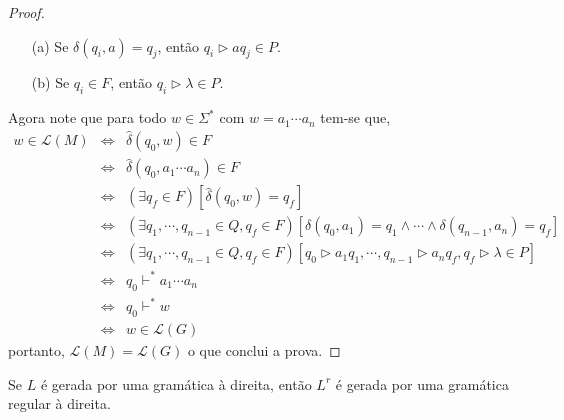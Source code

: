 \begin{proof}
	\begin{itemize}
		\item[(a)] Se $\delta(q_i, a) = q_j$, então $q_i \rhd aq_j \in P$.
		\item[(b)] Se $q_i \in F$, então $q_i \rhd \lambda \in P$.
	\end{itemize} 
	Agora note que para todo $w \in \Sigma^*$ com $w = a_1 \cdots a_n$ tem-se que, 
	\begin{eqnarray*}
		w \in \mathcal{L}(M) & \Longleftrightarrow & \widehat{\delta}(q_0, w) \in F\\
		& \Longleftrightarrow & \widehat{\delta}(q_0, a_1 \cdots a_n) \in F\\
		& \Longleftrightarrow & (\exists q_f \in F)[\widehat{\delta}(q_0, w) = q_f]\\
		& \Longleftrightarrow & (\exists q_1, \cdots, q_{n-1} \in Q,  q_f \in F)[\delta(q_0, a_1) = q_1 \land \cdots \land \delta(q_{n-1}, a_n) = q_f]\\
		& \Longleftrightarrow & (\exists q_1, \cdots, q_{n-1} \in Q,  q_f \in F)[q_0 \rhd a_1q_1, \cdots, q_{n-1} \rhd a_nq_f, q_f \rhd \lambda \in P]\\
		& \Longleftrightarrow & q_0 \vdash^* a_1 \cdots a_n\\
		& \Longleftrightarrow & q_0 \vdash^* w\\
		& \Longleftrightarrow & w \in \mathcal{L}(G)
	\end{eqnarray*} 
	portanto, $\mathcal{L}(M) = \mathcal{L}(G)$ o que conclui a prova.
\end{proof}

\begin{lemma}\label{lema:GRD-Reversa}
	Se $L$ é gerada por uma gramática à direita, então $L^r$ é gerada por uma gramática regular à direita.
\end{lemma}

